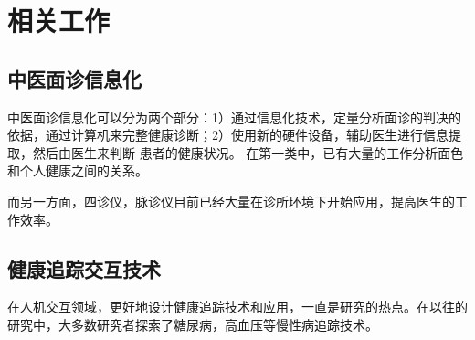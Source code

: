\chapter{相关工作}

\section{中医面诊信息化}
中医面诊信息化可以分为两个部分：1）通过信息化技术，定量分析面诊的判决的依据，通过计算机来完整健康诊断；2）使用新的硬件设备，辅助医生进行信息提取，然后由医生来判断
患者的健康状况。
在第一类中，已有大量的工作分析面色和个人健康之间的关系。

而另一方面，四诊仪，脉诊仪目前已经大量在诊所环境下开始应用，提高医生的工作效率。

\section{健康追踪交互技术}

在人机交互领域，更好地设计健康追踪技术和应用，一直是研究的热点。在以往的研究中，大多数研究者探索了糖尿病，高血压等慢性病追踪技术。